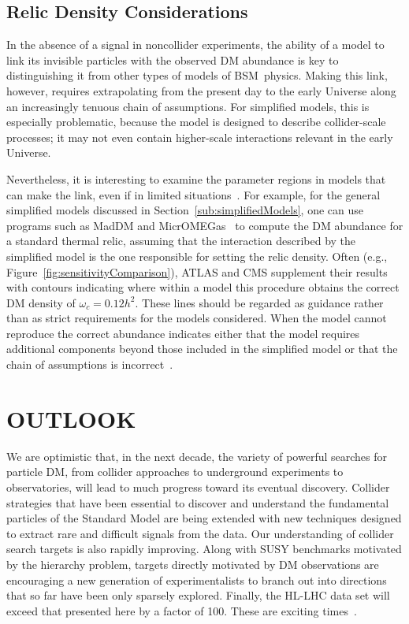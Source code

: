 \documentclass{ar-1col}
\newcommand{\IP}{invisible particle}
\begin{document}
{\subsection{Relic Density Considerations}

In the absence of a signal in noncollider experiments, the ability of a
model to link its {\IP}s with the observed DM abundance is key to
distinguishing it from other types of models of BSM\ physics. Making this link, however, requires extrapolating
from the present day to the early Universe along an increasingly
tenuous chain of assumptions. For simplified models, this is
especially problematic, because the model is designed to describe
collider-scale processes; it may not even contain higher-scale interactions
relevant in the early Universe. 

Nevertheless, it is interesting to
examine the parameter regions in models that can make the link, even if in limited
situations~\cite{Busoni:2014gta,Catena:2017xqq}. For example, for
the general simplified models discussed in
Section~\ref{sub:simplifiedModels}, one can use programs
such as MadDM and
MicrOMEGas~\cite{Backovic:2015cra,Barducci:2016pcb} to compute  the DM
abundance for a standard thermal relic, assuming that the
interaction described by the simplified model is the one
responsible for setting the relic density. Often (e.g.,
Figure~\ref{fig:sensitivityComparison}), ATLAS and CMS supplement
their results with contours indicating where within a model this
procedure obtains the correct DM density of $\omega_c =
0.12 h^2$. These lines should be regarded as guidance rather than as strict
requirements for the models considered. 
When the model cannot reproduce the correct abundance indicates either that  the model requires additional
components beyond those included in the simplified model or that
the chain of assumptions is incorrect~\cite{Bernal:2017kxu}.

\section{OUTLOOK}\label{sec:05_Future}

We are optimistic that, in the next decade, the variety of powerful searches for
particle DM, from collider approaches to underground
experiments to observatories, will lead to much progress toward its eventual discovery.
Collider strategies that have been essential to discover and understand the fundamental particles
of the Standard Model are being extended with new techniques designed to extract rare and difficult
signals from the data. Our understanding of
collider search targets is also rapidly improving. Along with SUSY
benchmarks motivated by the hierarchy problem, targets directly
motivated by DM observations are encouraging a new generation of
experimentalists to branch out into directions that so far have been only
sparsely explored. Finally, the HL-LHC data set will exceed that presented here by a factor of 100. These
are exciting times~\cite{Steigman:1979kw}.

}
\end{document}
